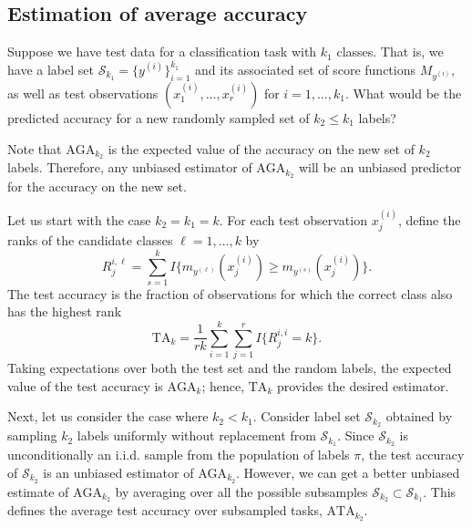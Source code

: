 \documentclass[twoside,11pt]{article}
\begin{document}
\subsection{Estimation of average accuracy}\label{sec:estimation_average_accuracy}

Suppose we have test data for a classification task with $k_1$ classes.  That is, we have a label set $\mathcal{S}_{k_1} =
\{y^{(i)}\}_{i=1}^{k_1}$ and its associated set of score functions
 $M_{y^{(i)}}$, as well as test observations $(x_1^{(i)},\hdots, x_{r}^{(i)})$ for $i =
1,\hdots, k_1$.  What would be the predicted accuracy for 
a new randomly sampled set of $k_2 \leq k_1$ labels? 

Note that $\text{AGA}_{k_2}$
is the expected value of the accuracy on the
new set of $k_2$ labels.  Therefore, any unbiased estimator of $\text{AGA}_{k_2}$ will be an unbiased predictor for the accuracy on the new set.

Let us start with the case $k_2 = k_1 = k$.  For each test observation $x_j^{(i)}$, define the ranks of the candidate classes $\ell = 1,\hdots, k$ by
\[
R_{j}^{i, \ell} = \sum_{s = 1}^k I\{m_{y^{(\ell)}}(x_j^{(i)}) \geq m_{y^{(s)}}(x_j^{(i)})\}.
\]
The test accuracy is the fraction of observations for which the correct class also has the highest rank
\begin{equation}\label{eq:test_risk}
\text{TA}_k = \frac{1}{r k} \sum_{i=1}^{k} \sum_{j=1}^{r} I\{R_j^{i,i} = k\}.
\end{equation}
Taking expectations over both the test set and the random labels, the expected value of the test accuracy is $\text{AGA}_k$; hence, $\text{TA}_k$ provides the desired estimator.

Next, let us consider the case where $k_2 < k_1$.  
Consider label set $\mathcal{S}_{k_2}$ obtained
by sampling $k_2$ labels uniformly without replacement from
$\mathcal{S}_{k_1}$. Since $\mathcal{S}_{k_2}$ is unconditionally an i.i.d. sample from 
the population of labels $\pi$, the test accuracy of $\mathcal{S}_{k_2}$ is an unbiased estimator of $\text{AGA}_{k_2}$.
However, we can get a better unbiased estimate of
$\text{AGA}_{k_2}$ by averaging over all the possible subsamples
$\mathcal{S}_{k_2} \subset \mathcal{S}_{k_1}$. 
This defines the average test accuracy over subsampled tasks, $\text{ATA}_{k_2}$.
\end{document}
